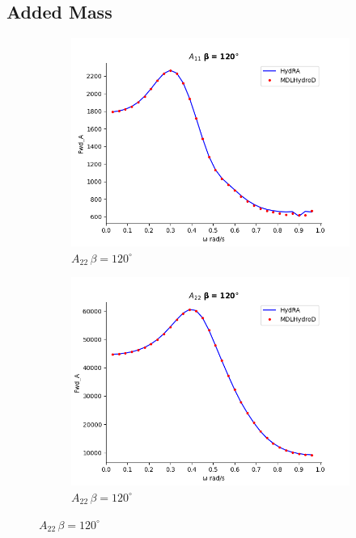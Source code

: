 \subsection{Added Mass}
\begin{figure}[H]
    \centering
    \begin{subfigure}[b]{0.45\textwidth}
        \includegraphics[width=\textwidth]{plots/kcs/added_mass_deg=120/a11.png}
        \caption{$A_{22} \, \beta = 120^{\circ}$}
    \end{subfigure}
    \begin{subfigure}[b]{0.45\textwidth}
        \includegraphics[width=\textwidth]{plots/kcs/added_mass_deg=120/a22.png}
        \caption{$A_{22} \, \beta = 120^{\circ}$}

\end{subfigure}
\end{figure}

